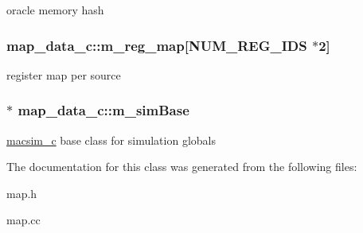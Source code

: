 \label{classmap__data__c_a48ae320988c5045e28f10321feae64f8}
oracle memory hash \hypertarget{classmap__data__c_a6d513b4921be0e1da6ca2360e799453a}{
\subsubsection[{m\_\-reg\_\-map}]{ {\bf map\_\-data\_\-c::m\_\-reg\_\-map}\mbox{[}NUM\_\-REG\_\-IDS $\ast$2\mbox{]}}}
\label{classmap__data__c_a6d513b4921be0e1da6ca2360e799453a}
register map per source \hypertarget{classmap__data__c_ac4f6915212a9d8a7df898996070a18a3}{
\subsubsection[{m\_\-simBase}]{$\ast$ {\bf map\_\-data\_\-c::m\_\-simBase}}}
\label{classmap__data__c_ac4f6915212a9d8a7df898996070a18a3}
\hyperlink{classmacsim__c}{macsim\_\-c} base class for simulation globals 

The documentation for this class was generated from the following files:\begin{DoxyCompactItemize}
\item 
map.h\item 
map.cc\end{DoxyCompactItemize}
